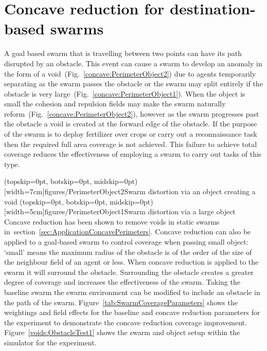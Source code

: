 \documentclass{ieeeaccess}
\begin{document}
\section{Concave reduction for destination-based swarms}\label{concave:mobileSwarm1}
A goal based swarm that is travelling between two points can have its path disrupted by an obstacle. This event can cause a swarm to develop an anomaly in the form of a void~(Fig.~\ref{concave:PerimeterObject2}) due to agents temporarily separating as the swarm passes the obstacle or the swarm may split entirely if the obstacle is very large~(Fig.~\ref{concave:PerimeterObject1}). 
When the object is small the cohesion and repulsion fields may make the swarm naturally reform~(Fig.~\ref{concave:PerimeterObject2}), however as the swarm progresses past the obstacle a void is created at the forward edge of the obstacle. If the purpose of the swarm is to deploy fertilizer over crops or carry out a reconnaissance task then the required full area coverage is not achieved. This failure to achieve total coverage reduces the effectiveness of employing a swarm to carry out tasks of this type.

\Figure[t!](topskip=0pt, botskip=0pt, midskip=0pt)[width=7cm]{figures/PerimeterObject2}{Swarm distortion via an object creating a void\label{concave:PerimeterObject2}}
\Figure[t!](topskip=0pt, botskip=0pt, midskip=0pt)[width=5cm]{figures/PerimeterObject1}{Swarm distortion via a large object\label{concave:PerimeterObject1}}
Concave reduction has been shown to remove voids in static swarms in~section~\ref{sec:ApplicationConcavePerimeters}. Concave reduction can also be applied to a goal-based swarm to control coverage when passing small object: `small' means the maximum radius of the obstacle is of the order of the size of the neighbour field of an agent or less. When concave reduction is applied to the swarm it will surround the obstacle. Surrounding the obstacle creates a greater degree of coverage and increases the effectiveness of the swarm.
Taking the baseline swarm the swarm environment can be modified to include an obstacle in the path of the swarm. Figure~\ref{tab:SwarmCoverageParameters} shows the weightings and field effects for the baseline and concave reduction parameters for the experiment to demonstrate the concave reduction coverage improvement. Figure~\ref{voids:ObstacleTest1} shows the swarm and object setup within the simulator for the experiment.
\end{document}
